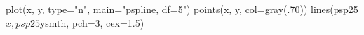\begin{Schunk}
\begin{Sinput}
 plot(x, y, type="n", main="pspline, df=5")
 points(x, y, col=gray(.70))
 lines(psp25$x, psp25$ysmth, pch=3, cex=1.5)
\end{Sinput}
\end{Schunk}
